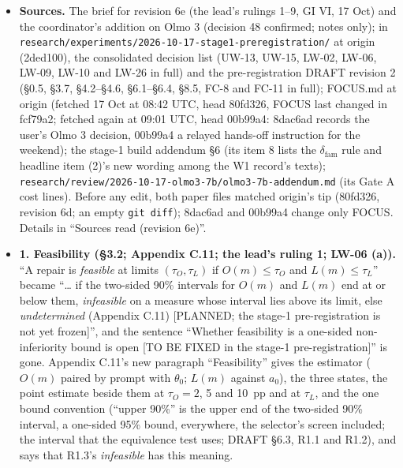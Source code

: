 \documentclass{article}
\theoremstyle{plain}
\theoremstyle{definition}
\theoremstyle{remark}
\begin{document}
\begin{itemize}
  \item \textbf{Sources.} The brief for revision 6e (the lead's rulings 1--9, GI
        VI, 17 Oct) and the coordinator's addition on Olmo 3 (decision 48
        confirmed; notes only); in
        \nolinkurl{research/experiments/2026-10-17-stage1-preregistration/} at
        origin (2ded100), the consolidated decision list (UW-13, UW-15, LW-02,
        LW-06, LW-09, LW-10 and LW-26 in full) and the pre-registration DRAFT
        revision 2 (\S{}0.5, \S{}3.7, \S{}4.2--\S{}4.6, \S{}6.1--\S{}6.4,
        \S{}8.5, FC-8 and FC-11 in full); FOCUS.md at origin (fetched 17 Oct at
        08:42 UTC, head 80fd326, FOCUS last changed in fcf79a2; fetched again at
        09:01 UTC, head 00b99a4: 8dac6ad records the user's Olmo 3 decision,
        00b99a4 a relayed hands-off instruction for the weekend); the stage-1
        build addendum \S{}6 (its item 8 lists the $\delta_{\mathrm{fam}}$ rule
        and headline item (2)'s new wording among the W1 record's texts);
        \nolinkurl{research/review/2026-10-17-olmo3-7b/olmo3-7b-addendum.md}
        (its Gate A cost lines). Before any edit, both paper files matched
        origin's tip (80fd326, revision 6d; an empty \texttt{git diff}); 8dac6ad
        and 00b99a4 change only FOCUS. Details in ``Sources read (revision
        6e)''.
  \item \textbf{1. Feasibility (\S{}3.2; Appendix C.11; the lead's ruling 1;
        LW-06 (a)).} ``A repair is \emph{feasible} at limits $(\tau_O, \tau_L)$
        if $O(m) \le \tau_O$ and $L(m) \le \tau_L$'' became ``\ldots{} if the
        two-sided 90\% intervals for $O(m)$ and $L(m)$ end at or below them,
        \emph{infeasible} on a measure whose interval lies above its limit, else
        \emph{undetermined} (Appendix C.11) [PLANNED; the stage-1
        pre-registration is not yet frozen]'', and the sentence ``Whether
        feasibility is a one-sided non-inferiority bound is open [TO BE FIXED in
        the stage-1 pre-registration]'' is gone. Appendix C.11's new paragraph
        ``Feasibility'' gives the estimator ($O(m)$ paired by prompt with
        $\theta_0$; $L(m)$ against $a_0$), the three states, the point estimate
        beside them at $\tau_O = 2$, 5 and 10~pp and at $\tau_L$, and the one
        bound convention (``upper 90\%'' is the upper end of the two-sided 90\%
        interval, a one-sided 95\% bound, everywhere, the selector's screen
        included; the interval that the equivalence test uses; DRAFT \S{}6.3,
        R1.1 and R1.2), and says that R1.3's \emph{infeasible} has this meaning.

\end{itemize}
\end{document}
